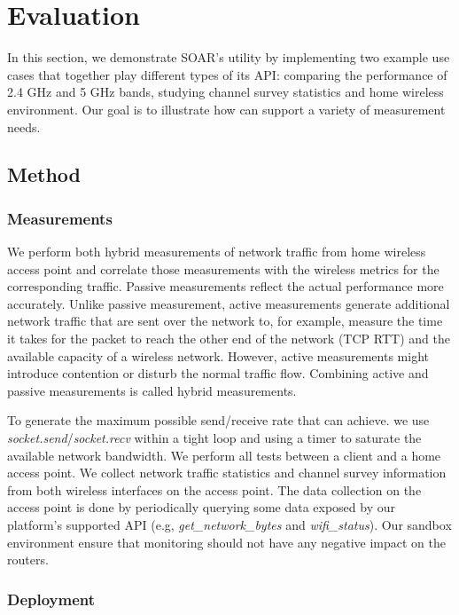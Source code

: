 \chapter{Evaluation} 
\label{sec.evaluation}
In this section, we demonstrate SOAR's utility by implementing two example use cases that together play different types of its API: comparing the performance of 2.4 GHz and 5 GHz bands, studying channel survey statistics and home wireless environment. Our goal is to illustrate how \sysname can support a variety of measurement needs.
\section{Method}
\subsection{Measurements}
\label{ssec.measurements}

We perform both hybrid measurements of network traffic from home wireless access point and correlate those measurements with the wireless metrics for the corresponding traffic. Passive measurements reflect the actual performance more accurately. Unlike passive measurement, active measurements generate additional network traffic that are sent over the network to, for example, measure the time it takes for the packet to reach the other end of the network (TCP RTT) and the available capacity of a wireless network. However, active measurements might introduce contention or disturb the normal traffic flow. Combining active and passive measurements is called hybrid measurements. 

To generate the maximum possible send/receive rate that \sysname can achieve. we use \textit{socket.send}/\textit{socket.recv} within a tight loop and using a timer to saturate the available network bandwidth. We perform all tests between a client and a home access point. We collect network traffic statistics and channel survey information from both wireless interfaces on the access point. The data collection on the access point is done by periodically querying some data exposed by our platform's supported API (e.g, \textit{get\_network\_bytes} and \textit{wifi\_status}). Our sandbox environment ensure that monitoring should not have any negative impact on the routers. 
 
\subsection{Deployment}
\label{ssec.deployment}

